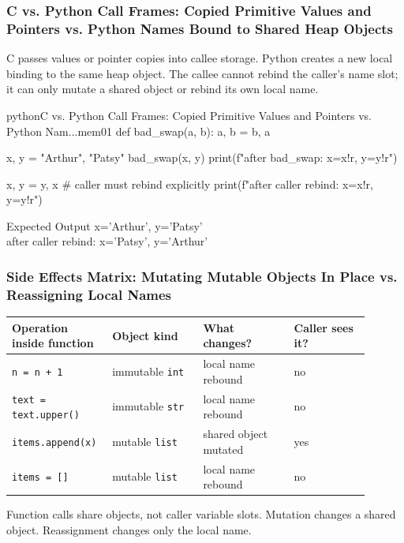 \subsubsection{C vs. Python Call Frames: Copied Primitive Values and Pointers vs. Python Names Bound to Shared Heap Objects}

C passes values or pointer copies into callee storage. Python creates a new local binding to the same heap object. The callee cannot rebind the caller's name slot; it can only mutate a shared object or rebind its own local name.

\begin{codebox}[]{python}{C vs. Python Call Frames: Copied Primitive Values and Pointers vs. Python Nam...}{mem01}
def bad_swap(a, b):
    a, b = b, a

x, y = "Arthur", "Patsy"
bad_swap(x, y)
print(f"after bad_swap: x={x!r}, y={y!r}")

x, y = y, x  # caller must rebind explicitly
print(f"after caller rebind: x={x!r}, y={y!r}")
\end{codebox}


\begin{iobox}{Expected Output}
x='Arthur', y='Patsy' \\
after caller rebind: x='Patsy', y='Arthur' \\
\end{iobox}




\subsubsection{Side Effects Matrix: Mutating Mutable Objects In Place vs. Reassigning Local Names}

\begin{center}
\begin{tabular}{|p{0.22\linewidth}|p{0.24\linewidth}|p{0.24\linewidth}|p{0.20\linewidth}|}
\hline
\textbf{Operation inside function} & \textbf{Object kind} & \textbf{What changes?} & \textbf{Caller sees it?} \\
\hline
\texttt{n = n + 1} & immutable \texttt{int} & local name rebound & no \\
\hline
\texttt{text = text.upper()} & immutable \texttt{str} & local name rebound & no \\
\hline
\texttt{items.append(x)} & mutable \texttt{list} & shared object mutated & yes \\
\hline
\texttt{items = []} & mutable \texttt{list} & local name rebound & no \\
\hline
\end{tabular}
\end{center}

Function calls share objects, not caller variable slots. Mutation changes a shared object. Reassignment changes only the local name.
